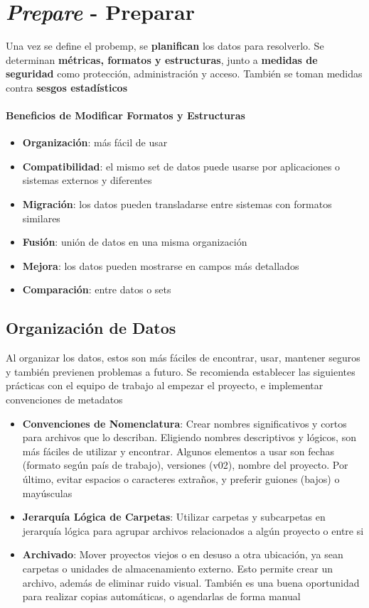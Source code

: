 \section{\textit{Prepare} - Preparar}
Una vez se define el \gls{probemp}, se \textbf{planifican} los datos para resolverlo. Se determinan \textbf{métricas, formatos y estructuras}, junto a \textbf{medidas de seguridad} como protección, administración y acceso. También se toman medidas contra \textbf{sesgos estadísticos}

\paragraph{Beneficios de Modificar Formatos y Estructuras}
\begin{itemize}
    \item {\textbf{Organización}: más fácil de usar}
    \item {\textbf{Compatibilidad}: el mismo set de datos puede usarse por aplicaciones o sistemas externos y diferentes}
    \item {\textbf{Migración}: los datos pueden transladarse entre sistemas con formatos similares}
    \item {\textbf{Fusión}: unión de datos en una misma organización}
    \item {\textbf{Mejora}: los datos pueden mostrarse en campos más detallados}
    \item {\textbf{Comparación}: entre datos o sets}
\end{itemize}

\subsection{Organización de Datos}
Al organizar los datos, estos son más fáciles de encontrar, usar, mantener seguros y también previenen problemas a futuro. Se recomienda establecer las siguientes prácticas con el equipo de trabajo al empezar el proyecto, e implementar convenciones de metadatos
\begin{itemize}
    \item {\textbf{Convenciones de Nomenclatura}: Crear nombres significativos y cortos para archivos que lo describan. Eligiendo nombres descriptivos y lógicos, son más fáciles de utilizar y encontrar. Algunos elementos a usar son fechas (formato según país de trabajo), versiones (v02), nombre del proyecto. Por último, evitar espacios o caracteres extraños, y preferir guiones (bajos) o mayúsculas}
    \item {\textbf{Jerarquía Lógica de Carpetas}: Utilizar carpetas y subcarpetas en jerarquía lógica para agrupar archivos relacionados a algún proyecto o entre si}
    \item {\textbf{Archivado}: Mover proyectos viejos o en desuso a otra ubicación, ya sean carpetas o unidades de almacenamiento externo. Esto permite crear un archivo, además de eliminar ruido visual. También es una buena oportunidad para realizar copias automáticas, o agendarlas de forma manual}
\end{itemize}

